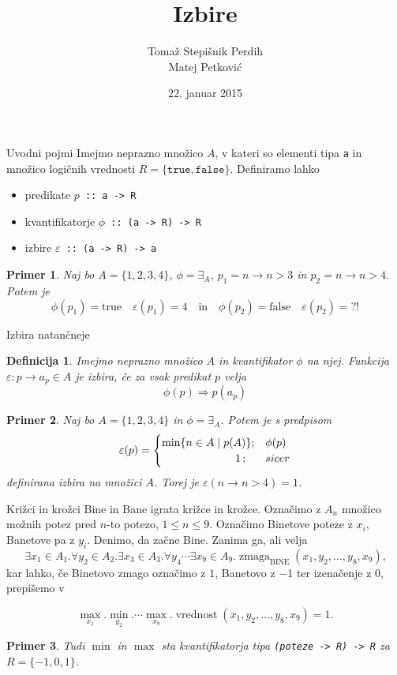 \documentclass{beamer}
\author[Sintektična sladkorčka]{Tomaž Stepišnik Perdih\\  Matej Petković}
\title{Izbire}
\date{{22. januar 2015}}
\newtheorem{defin}{Definicija}
\newtheorem{prim}{Primer}
\def\eps{\varepsilon}
\def\obs{\exists}
\def\fora{\forall}
\begin{document}
\begin{frame}
\titlepage 
\end{frame}

\begin{frame}{Uvodni pojmi}
Imejmo neprazno množico $A$, v kateri so elementi tipa \texttt{a}  in množico logičnih vrednosti $R =  \{ \texttt{true}, \texttt{false}\} $. Definiramo lahko
\begin{itemize}
\item predikate\; $p$\texttt{ :: a -> R}
\item kvantifikatorje\; $\phi$\texttt{ :: (a -> R) -> R}
\item izbire $\varepsilon$\texttt{ :: (a -> R) -> a}
\end{itemize}

\begin{prim}
Naj bo $A = \{1,2,3,4\}$, $\phi = \exists_A$, $p_1 = n \to n > 3$ in $p_2 = n\to n > 4$. Potem je
$$\phi(p_1) = \text{true}\quad\varepsilon (p_1) = 4\quad\text{in}\quad\phi(p_2) = \text{false}\quad\varepsilon (p_2) = \text{?!}$$
\end{prim}

\end{frame}

\begin{frame}{Izbira natančneje}
\begin{defin}
Imejmo neprazno množico $A$ in kvantifikator $\phi$ na njej. Funkcija $\eps: p \to a_p\in A$ je izbira, če za vsak predikat $p$ velja
$$\phi (p)\Longrightarrow p(a_p)$$
\end{defin}

\begin{prim}
Naj bo $A = \{1,2,3,4\}$ in $\phi = \exists_A$. Potem je s predpisom
$$\eps (p) =
\begin{cases}
\min \{ n \in A \mid p(A) \} ;& \phi(p)\\
\hphantom{oooooooooioooo}1\, ;& sicer
\end{cases}
$$
definirana izbira na množici $A$. Torej je $\eps (n \to n > 4) = 1$.
\end{prim}

\end{frame}

\begin{frame}{Križci in krožci}
Bine in Bane igrata križce in krožce. Označimo z $A_n$ množico možnih potez pred $n$-to potezo, $1\leq n\leq 9$.
Označimo Binetove poteze z $x_i$, Banetove pa z $y_i$. Denimo, da začne Bine.  Zanima ga, ali velja
$$\obs x_1\in A_1.\fora y_2 \in A_2. \obs x_3\in A_3.\fora y_4 \cdots \obs x_9 \in A_9. \operatorname{zmaga}_\text{BINE}(x_1,y_2,\dots, y_8,x_9) \text{,}$$
\pause
kar lahko, če Binetovo zmago označimo z $1$, Banetovo z $-1$ ter izenačenje z $0$, prepišemo v

$$\max_{x_1}. \min_{y_2}. \cdots \max_{x_9}. \operatorname{vrednost}(x_1, y_2,\dots, y_8, x_9) = 1\text{.}$$

\begin{prim}
Tudi $\min$ in $\max$ sta kvantifikatorja tipa \texttt{(poteze -> R) -> R} za $R = \{-1, 0, 1\}$.
\end{prim}

\end{frame}
\end{document}
